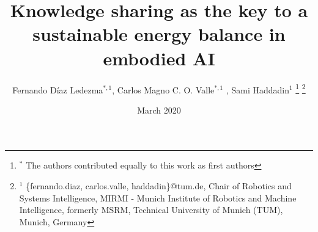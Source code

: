 \documentclass[a4, 10 pt, journal]{IEEEtran}
\begin{document}
\pagestyle{empty}
\title{Knowledge sharing as the key to a sustainable energy balance in embodied AI}

\author{Fernando D\'iaz Ledezma$^{*,1}$, Carlos Magno C. O. Valle$^{*,1}$ 
, Sami Haddadin$^{1}$%
\thanks{$^{*}$ The authors contributed equally to this work as first authors}
\thanks{$^{1}$ {\small \{fernando.diaz, carlos.valle, haddadin\}@tum.de}, 
Chair of Robotics and Systems Intelligence, MIRMI - Munich Institute of Robotics and Machine Intelligence, formerly MSRM, Technical University of Munich (TUM), Munich, Germany}}
\date{March 2020}

\twocolumn[
  \begin{@twocolumnfalse}
    \maketitle
  \end{@twocolumnfalse}
]

\end{document}
